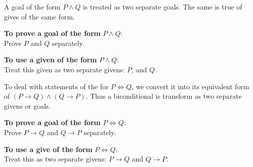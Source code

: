 A goal of the form $P \land Q$ is treated as two separate goals. The same is true of gives of the same form.

\textbf{To prove a goal of the form} $P \land Q$:\\
Prove $P$ and $Q$ separately.

\textbf{To use a given of the form} $P \land Q$:\\
Treat this given as two separate givens: $P$, and $Q$.

To deal with statements of the for $P \iff Q$, we convert it into its equivalent form of $(P \rightarrow Q) \land (Q \rightarrow P)$. Thus a biconditional is transform as two separate givens or goals.

\textbf{To prove a goal of the form} $P \iff Q$:\\
Prove $P \rightarrow Q$ and $Q \rightarrow P$ separately.

\textbf{To use a give of the form} $P \iff Q$:\\
Treat this as two separate givens: $P \rightarrow Q$ and $Q \rightarrow P$.